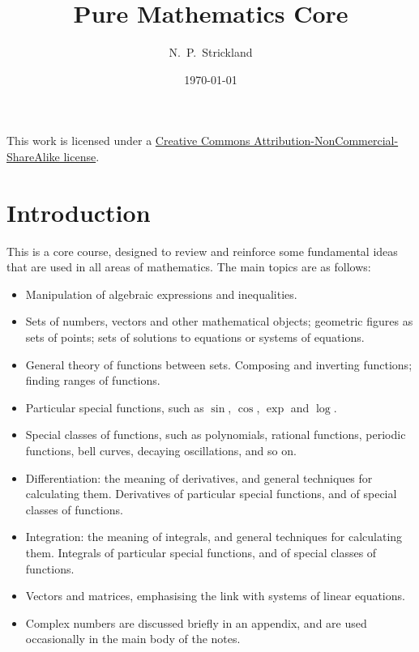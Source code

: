 \documentclass[a4paper]{book}
\theoremstyle{definition}
\begin{document}
\title{Pure Mathematics Core}
\author{N.~P.~Strickland}
\date{\today}


\maketitle

\begin{center}
 This work is licensed under a 
 \href{https://creativecommons.org/licenses/by-nc-sa/3.0/deed.en}{
  Creative Commons Attribution-NonCommercial-ShareAlike license}.
 
 \bigskip

 \doclicenseImage 
\end{center}

\tableofcontents
{}

\chapter{Introduction}\label{chap-intro}

This is a core course, designed to review and reinforce some
fundamental ideas that are used in all areas of mathematics.  The main
topics are as follows:
\begin{itemize}
 \item Manipulation of algebraic expressions and inequalities.
 \item Sets of numbers, vectors and other mathematical objects;
  geometric figures as sets of points; sets of solutions to equations
  or systems of equations.
 \item General theory of functions between sets.  Composing and
  inverting functions; finding ranges of functions.
 \item Particular special functions, such as $\sin$, $\cos$, $\exp$
  and $\log$.
 \item Special classes of functions, such as polynomials, rational
  functions, periodic functions, bell curves, decaying oscillations,
  and so on.
 \item Differentiation: the meaning of derivatives, and general
  techniques for calculating them.  Derivatives of particular
  special functions, and of special classes of functions.
 \item Integration: the meaning of integrals, and general
  techniques for calculating them.  Integrals of particular
  special functions, and of special classes of functions.
 \item Vectors and matrices, emphasising the link with systems of
  linear equations.
 \item Complex numbers are discussed briefly in an appendix, and are
  used occasionally in the main body of the notes.
\end{itemize}
\end{document}
